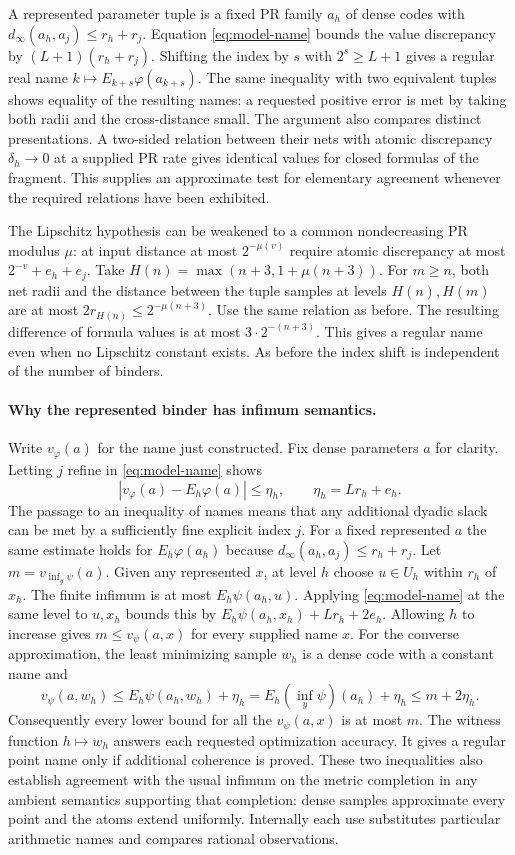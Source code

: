 A represented parameter tuple is a fixed PR family $a_h$ of dense codes
with $d_\infty(a_h,a_j)\le r_h+r_j$. Equation \eqref{eq:model-name}
bounds the value discrepancy by $(L+1)(r_h+r_j)$. Shifting the index by
$s$ with $2^s\ge L+1$ gives a regular real name
$k\mapsto E_{k+s}\varphi(a_{k+s})$. The same inequality with two
equivalent tuples shows equality of the resulting names: a requested
positive error is met by taking both radii and the cross-distance small.
The argument also compares distinct presentations. A two-sided relation
between their nets with atomic discrepancy $\delta_h\to0$ at a supplied
PR rate gives identical values for closed formulas of the fragment.
This supplies an approximate test for elementary agreement whenever
the required relations have been exhibited.

The Lipschitz hypothesis can be weakened to a common nondecreasing PR
modulus $\mu$: at input distance at most $2^{-\mu(v)}$ require atomic
discrepancy at most $2^{-v}+e_h+e_j$. Take
$H(n)=\max(n+3,1+\mu(n+3))$. For $m\ge n$, both net radii and the
distance between the tuple samples at levels $H(n),H(m)$ are at most
$2r_{H(n)}\le 2^{-\mu(n+3)}$. Use the same relation as before.
The resulting difference of formula values is at most
$3\cdot2^{-(n+3)}$. This gives a regular name even when no Lipschitz
constant exists. As before the index shift is independent of the number
of binders.

\paragraph{Why the represented binder has infimum semantics.}
Write $v_\varphi(a)$ for the name just constructed. Fix dense parameters
$a$ for clarity. Letting $j$ refine in \eqref{eq:model-name} shows
\[
    |v_\varphi(a)-E_h\varphi(a)|\le\eta_h,
    \qquad \eta_h=Lr_h+e_h .
\]
The passage to an inequality of names means that any additional dyadic
slack can be met by a sufficiently fine explicit index $j$.
For a fixed represented $a$ the same estimate holds for $E_h\varphi(a_h)$
because $d_\infty(a_h,a_j)\le r_h+r_j$.
Let $m=v_{\inf_y\psi}(a)$. Given any represented $x$, at level $h$
choose $u\in U_h$ within $r_h$ of $x_h$. The finite infimum is at most
$E_h\psi(a_h,u)$. Applying \eqref{eq:model-name} at the same level to
$u,x_h$ bounds this by $E_h\psi(a_h,x_h)+Lr_h+2e_h$.
Allowing $h$ to increase gives $m\le v_\psi(a,x)$ for every supplied
name $x$. For the converse approximation, the least minimizing sample
$w_h$ is a dense code with a constant name and
\[
 v_\psi(a,w_h)\le E_h\psi(a_h,w_h)+\eta_h
  = E_h(\inf_y\psi)(a_h)+\eta_h\le m+2\eta_h .
\]
Consequently every lower bound for all the $v_\psi(a,x)$ is at most $m$.
The witness function $h\mapsto w_h$ answers each requested optimization
accuracy. It gives a regular point name only if additional coherence is
proved. These two inequalities also establish agreement with the usual
infimum on the metric completion in any ambient semantics supporting that
completion: dense samples approximate every point and the atoms extend
uniformly. Internally each use substitutes particular arithmetic names and
compares rational observations.

